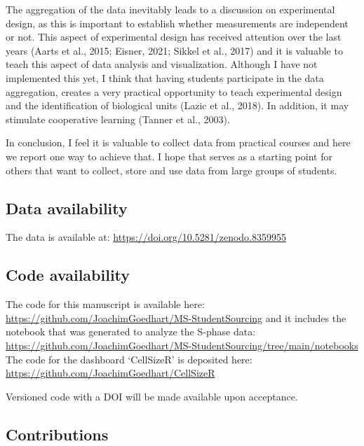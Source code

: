 \documentclass[
]{agujournal2019}
\begin{document}
The aggregation of the data inevitably leads to a discussion on
experimental design, as this is important to establish whether
measurements are independent or not. This aspect of experimental design
has received attention over the last years (Aarts et al., 2015; Eisner,
2021; Sikkel et al., 2017) and it is valuable to teach this aspect of
data analysis and visualization. Although I have not implemented this
yet, I think that having students participate in the data aggregation,
creates a very practical opportunity to teach experimental design and
the identification of biological units (Lazic et al., 2018). In
addition, it may stimulate cooperative learning (Tanner et al., 2003).

In conclusion, I feel it is valuable to collect data from practical
courses and here we report one way to achieve that. I hope that serves
as a starting point for others that want to collect, store and use data
from large groups of students.

\hypertarget{data-availability}{%
\subsection*{Data availability}\label{data-availability}}

The data is available at: \url{https://doi.org/10.5281/zenodo.8359955}

\hypertarget{code-availability}{%
\subsection*{Code availability}\label{code-availability}}

The code for this manuscript is available here:
\url{https://github.com/JoachimGoedhart/MS-StudentSourcing} and it
includes the notebook that was generated to analyze the S-phase data:
\url{https://github.com/JoachimGoedhart/MS-StudentSourcing/tree/main/notebooks}
The code for the dashboard `CellSizeR' is deposited here:
\url{https://github.com/JoachimGoedhart/CellSizeR}

Versioned code with a DOI will be made available upon acceptance.

\hypertarget{contributions}{%
\subsection*{Contributions}\label{contributions}}
\end{document}
